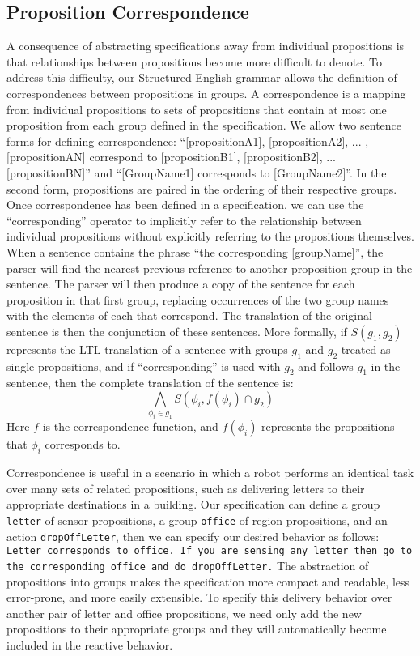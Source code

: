 \subsection{Proposition Correspondence} 
A consequence of abstracting specifications away from individual propositions is that relationships between propositions become more difficult to denote. To address this difficulty, our Structured English grammar allows the definition of correspondences between propositions in groups. A correspondence is a mapping from individual propositions to sets of propositions that contain at most one proposition from each group defined in the specification. We allow two sentence forms for defining correspondence: ``[propositionA1], [propositionA2], ... , [propositionAN] correspond to [propositionB1], [propositionB2], ... [propositionBN]'' and ``[GroupName1] corresponds to [GroupName2]''. In the second form, propositions are paired in the ordering of their respective groups. Once correspondence has been defined in a specification, we can use the ``corresponding'' operator to implicitly refer to the relationship between individual propositions without explicitly referring to the propositions themselves. When a sentence contains the phrase ``the corresponding [groupName]'', the parser will find the nearest previous reference to another proposition group in the sentence. The parser will then produce a copy of the sentence for each proposition in that first group, replacing occurrences of the two group names with the elements of each that correspond. The translation of the original sentence is then the conjunction of these sentences. More formally, if $S(g_1,g_2)$ represents the LTL translation of a sentence with groups $g_1$ and $g_2$ treated as single propositions, and if ``corresponding'' is used with $g_2$ and follows $g_1$ in the sentence, then the complete translation of the sentence is:
\begin{equation*}
	\bigwedge \limits_{\phi_i \in g_1} S(\phi_i, f(\phi_i) \cap g_2)
\end{equation*}
Here $f$ is the correspondence function, and $f(\phi_i)$ represents the propositions that $\phi_i$ corresponds to. 

\begin{myExample}\label{Ex:corresponding}
	Correspondence is useful in a scenario in which a robot performs an identical task over many sets of related propositions, such as delivering letters to their appropriate destinations in a building. Our specification can define a group \texttt{letter} of sensor propositions, a group \texttt{office} of region propositions, and an action \texttt{dropOffLetter}, then we can specify our desired behavior as follows: \texttt{Letter corresponds to office. If you are sensing any letter then go to the corresponding office and do dropOffLetter.} The abstraction of propositions into groups makes the specification more compact and readable, less error-prone, and more easily extensible. To specify this delivery behavior over another pair of letter and office propositions, we need only add the new propositions to their appropriate groups and they will automatically become included in the reactive behavior. 
\end{myExample}

